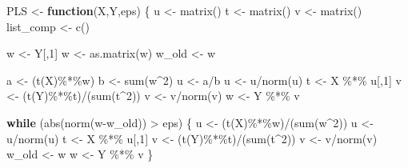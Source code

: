 \documentclass[
]{article}
\newenvironment{Shaded}{\begin{snugshade}}{\end{snugshade}}
\newcommand{\ControlFlowTok}[1]{\textcolor[rgb]{0.13,0.29,0.53}{\textbf{#1}}}
\newcommand{\DecValTok}[1]{\textcolor[rgb]{0.00,0.00,0.81}{#1}}
\newcommand{\FunctionTok}[1]{\textcolor[rgb]{0.00,0.00,0.00}{#1}}
\newcommand{\NormalTok}[1]{#1}
\newcommand{\OtherTok}[1]{\textcolor[rgb]{0.56,0.35,0.01}{#1}}
\newcommand{\SpecialCharTok}[1]{\textcolor[rgb]{0.00,0.00,0.00}{#1}}
\begin{document}
\begin{Shaded}
\begin{Highlighting}[]
\NormalTok{PLS }\OtherTok{\textless{}{-}} \ControlFlowTok{function}\NormalTok{(X,Y,eps) \{}
\NormalTok{  u }\OtherTok{\textless{}{-}} \FunctionTok{matrix}\NormalTok{() }
\NormalTok{  t }\OtherTok{\textless{}{-}} \FunctionTok{matrix}\NormalTok{() }
\NormalTok{  v }\OtherTok{\textless{}{-}} \FunctionTok{matrix}\NormalTok{()}
\NormalTok{  list\_comp }\OtherTok{\textless{}{-}} \FunctionTok{c}\NormalTok{()}

\NormalTok{  w }\OtherTok{\textless{}{-}}\NormalTok{ Y[,}\DecValTok{1}\NormalTok{]}
\NormalTok{  w }\OtherTok{\textless{}{-}} \FunctionTok{as.matrix}\NormalTok{(w)}
\NormalTok{  w\_old }\OtherTok{\textless{}{-}}\NormalTok{ w}
  
\NormalTok{  a }\OtherTok{\textless{}{-}}\NormalTok{ (}\FunctionTok{t}\NormalTok{(X)}\SpecialCharTok{\%*\%}\NormalTok{w)}
\NormalTok{  b }\OtherTok{\textless{}{-}} \FunctionTok{sum}\NormalTok{(w}\SpecialCharTok{\^{}}\DecValTok{2}\NormalTok{)}
\NormalTok{  u }\OtherTok{\textless{}{-}}\NormalTok{ a}\SpecialCharTok{/}\NormalTok{b}
\NormalTok{  u }\OtherTok{\textless{}{-}}\NormalTok{ u}\SpecialCharTok{/}\FunctionTok{norm}\NormalTok{(u)}
\NormalTok{  t }\OtherTok{\textless{}{-}}\NormalTok{ X }\SpecialCharTok{\%*\%}\NormalTok{ u[,}\DecValTok{1}\NormalTok{]}
\NormalTok{  v }\OtherTok{\textless{}{-}}\NormalTok{ (}\FunctionTok{t}\NormalTok{(Y)}\SpecialCharTok{\%*\%}\NormalTok{t)}\SpecialCharTok{/}\NormalTok{(}\FunctionTok{sum}\NormalTok{(t}\SpecialCharTok{\^{}}\DecValTok{2}\NormalTok{))}
\NormalTok{  v }\OtherTok{\textless{}{-}}\NormalTok{ v}\SpecialCharTok{/}\FunctionTok{norm}\NormalTok{(v)}
\NormalTok{  w }\OtherTok{\textless{}{-}}\NormalTok{ Y }\SpecialCharTok{\%*\%}\NormalTok{ v}
  
  \ControlFlowTok{while}\NormalTok{ (}\FunctionTok{abs}\NormalTok{(}\FunctionTok{norm}\NormalTok{(w}\SpecialCharTok{{-}}\NormalTok{w\_old)) }\SpecialCharTok{\textgreater{}}\NormalTok{ eps) \{ }
\NormalTok{    u }\OtherTok{\textless{}{-}}\NormalTok{ (}\FunctionTok{t}\NormalTok{(X)}\SpecialCharTok{\%*\%}\NormalTok{w)}\SpecialCharTok{/}\NormalTok{(}\FunctionTok{sum}\NormalTok{(w}\SpecialCharTok{\^{}}\DecValTok{2}\NormalTok{))}
\NormalTok{    u }\OtherTok{\textless{}{-}}\NormalTok{ u}\SpecialCharTok{/}\FunctionTok{norm}\NormalTok{(u)}
\NormalTok{    t }\OtherTok{\textless{}{-}}\NormalTok{ X }\SpecialCharTok{\%*\%}\NormalTok{ u[,}\DecValTok{1}\NormalTok{]}
\NormalTok{    v }\OtherTok{\textless{}{-}}\NormalTok{ (}\FunctionTok{t}\NormalTok{(Y)}\SpecialCharTok{\%*\%}\NormalTok{t)}\SpecialCharTok{/}\NormalTok{(}\FunctionTok{sum}\NormalTok{(t}\SpecialCharTok{\^{}}\DecValTok{2}\NormalTok{))}
\NormalTok{    v }\OtherTok{\textless{}{-}}\NormalTok{ v}\SpecialCharTok{/}\FunctionTok{norm}\NormalTok{(v)}
\NormalTok{    w\_old }\OtherTok{\textless{}{-}}\NormalTok{ w}
\NormalTok{    w }\OtherTok{\textless{}{-}}\NormalTok{ Y }\SpecialCharTok{\%*\%}\NormalTok{ v}
\NormalTok{  \}}
  

\end{Highlighting}
\end{Shaded}
\end{document}
